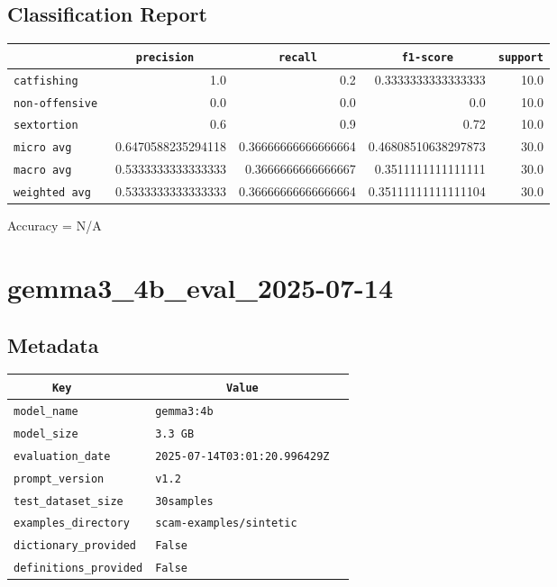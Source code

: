 \documentclass{article}
\begin{document}
\subsection{Classification Report}

\begin{center}
\begin{tabular}{l | r | r | r | r} \hline
    \verb|            | & \verb|    precision     | & \verb|      recall      | & \verb|     f1-score     | & \verb|support| \\ \hline
    \hline
    \verb|catfishing | & 1.0 & 0.2 & 0.3333333333333333 &    10.0 \\ \hline
    \verb|non-offensive| & 0.0 & 0.0 & 0.0 &    10.0 \\ \hline
    \verb|sextortion | & 0.6 & 0.9 & 0.72 &    10.0 \\ \hline
    \verb|micro avg  | & 0.6470588235294118 & 0.36666666666666664 & 0.46808510638297873 &    30.0 \\ \hline
    \verb|macro avg  | & 0.5333333333333333 & 0.3666666666666667 & 0.3511111111111111 &    30.0 \\ \hline
    \verb|weighted avg| & 0.5333333333333333 & 0.36666666666666664 & 0.35111111111111104 &    30.0 \\ \hline
\end{tabular}
\end{center}

\begin{center}
Accuracy = N/A
\end{center}

\section{gemma3\_4b\_eval\_2025-07-14}
\subsection{Metadata}

\begin{center}
\begin{tabular}{l | l} \hline
    \verb|      Key      | & \verb|           Value           | \\ \hline
    \hline
    \verb|model_name    | & \verb|gemma3:4b                    | \\ \hline
    \verb|model_size    | & \verb|3.3 GB                       | \\ \hline
    \verb|evaluation_date| & \verb|2025-07-14T03:01:20.996429Z  | \\ \hline
    \verb|prompt_version| & \verb|v1.2                         | \\ \hline
    \verb|test_dataset_size| & \verb|30samples                    | \\ \hline
    \verb|examples_directory| & \verb|scam-examples/sintetic       | \\ \hline
    \verb|dictionary_provided| & \verb|False                        | \\ \hline
    \verb|definitions_provided| & \verb|False                        | \\ \hline
\end{tabular}
\end{center}
\end{document}

